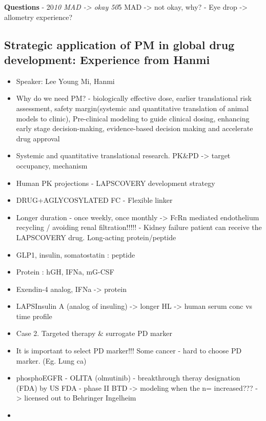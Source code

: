\documentclass[]{book}
\providecommand{\tightlist}{%
  \setlength{\itemsep}{0pt}\setlength{\parskip}{0pt}}
\begin{document}
\textbf{Questions} - 20\emph{10 MAD -\textgreater{} okay 50}5 MAD
-\textgreater{} not okay, why? - Eye drop -\textgreater{} allometry
experience?

\subsection{Strategic application of PM in global drug development:
Experience from
Hanmi}\label{strategic-application-of-pm-in-global-drug-development-experience-from-hanmi}

\begin{itemize}
\tightlist
\item
  Speaker: Lee Young Mi, Hanmi
\item
  Why do we need PM? - biologically effective dose, earlier
  translational risk assessment, safety margin(systemic and quantitative
  translation of animal models to clinic), Pre-clinical modeling to
  guide clinical dosing, enhancing early stage decision-making,
  evidence-based decision making and accelerate drug approval
\item
  Systemic and quantitative translational research. PK\&PD
  -\textgreater{} target occupancy, mechanism
\item
  Human PK projections - LAPSCOVERY development strategy
\item
  DRUG+AGLYCOSYLATED FC - Flexible linker
\item
  Longer duration - once weekly, once monthly -\textgreater{} FcRn
  mediated endothelium recycling / avoiding renal filtration!!!!! -
  Kidney failure patient can receive the LAPSCOVERY drug. Long-acting
  protein/peptide
\item
  GLP1, insulin, somatostatin : peptide
\item
  Protein : hGH, IFNa, mG-CSF
\item
  Exendin-4 analog, IFNa -\textgreater{} protein
\item
  LAPSInsulin A (analog of insuling) -\textgreater{} longer HL
  -\textgreater{} human serum conc vs time profile
\item
  Case 2. Targeted therapy \& surrogate PD marker
\item
  It is important to select PD marker!!! Some cancer - hard to choose PD
  marker. (Eg. Lung ca)
\item
  phosphoEGFR - OLITA (olmutinib) - breakthrough theray designation
  (FDA) by US FDA - phase II BTD -\textgreater{} modeling when the n=
  increased??? -\textgreater{} licensed out to Behringer Ingelheim
\item

\end{itemize}
\end{document}
